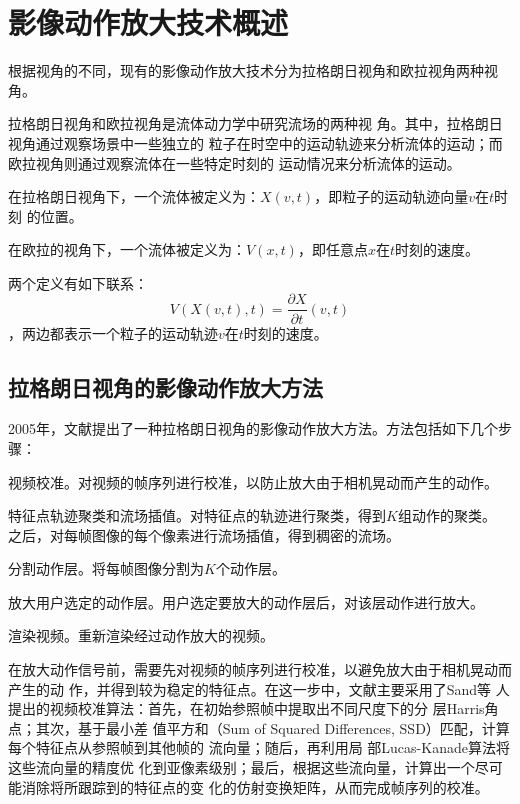 \chapter{影像动作放大技术概述}
\label{chap:previous}

根据视角的不同，现有的影像动作放大技术分为拉格朗日视角和欧拉视角两种视角。

拉格朗日视角和欧拉视角是流体动力学中研究流场的两种视
角。其中，拉格朗日视角通过观察场景中一些独立的
粒子在时空中的运动轨迹来分析流体的运动；而欧拉视角则通过观察流体在一些特定时刻的
运动情况来分析流体的运动。

\begin{definition}[拉格朗日视角的流体]
  在拉格朗日视角下，一个流体被定义为：$X(v,t)$，即粒子的运动轨迹向量$v$在$t$时刻
  的位置。
\end{definition}

\begin{definition}[欧拉视角的流体]
  在欧拉的视角下，一个流体被定义为：$V(x,t)$，即任意点$x$在$t$时刻的速度。
\end{definition}

两个定义有如下联系：
$$V(X(v,t),t)=\frac{\partial X}{\partial t}(v, t)$$，两边都表示一个粒子的运动轨迹$v$在$t$时刻的速度。

\section{拉格朗日视角的影像动作放大方法}
\label{sec:lagriangian}

2005年，文献\cite{liu2005motion}提出了一种拉格朗日视角的影像动作放大方法。方法包括如下几个步骤：

\begin{compactenum}
\item 视频校准。对视频的帧序列进行校准，以防止放大由于相机晃动而产生的动作。
\item 特征点轨迹聚类和流场插值。对特征点的轨迹进行聚类，得到$K$组动作的聚类。
  之后，对每帧图像的每个像素进行流场插值，得到稠密的流场。
\item 分割动作层。将每帧图像分割为$K$个动作层。
\item 放大用户选定的动作层。用户选定要放大的动作层后，对该层动作进行放大。
\item 渲染视频。重新渲染经过动作放大的视频。
\end{compactenum}

在放大动作信号前，需要先对视频的帧序列进行校准，以避免放大由于相机晃动而产生的动
作，并得到较为稳定的特征点。在这一步中，文献\cite{liu2005motion}主要采用了Sand等
人提出的视频校准算法：首先，在初始参照帧中提取出不同尺度下的分
层Harris角点；其次，基于最小差
值平方和（Sum of Squared Differences, SSD）匹配，计算每个特征点从参照帧到其他帧的
流向量；随后，再利用局
部Lucas-Kanade算法将这些流向量的精度优
化到亚像素级别；最后，根据这些流向量，计算出一个尽可能消除将所跟踪到的特征点的变
化的仿射变换矩阵，从而完成帧序列的校准。

